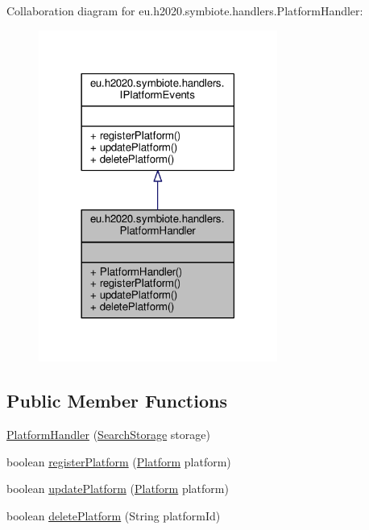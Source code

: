 Collaboration diagram for eu.\+h2020.\+symbiote.\+handlers.\+Platform\+Handler\+:
\nopagebreak
\begin{figure}[H]
\begin{center}
\leavevmode
\includegraphics[width=222pt]{classeu_1_1h2020_1_1symbiote_1_1handlers_1_1PlatformHandler__coll__graph}
\end{center}
\end{figure}
\subsection*{Public Member Functions}
\begin{DoxyCompactItemize}
\item 
\hyperlink{classeu_1_1h2020_1_1symbiote_1_1handlers_1_1PlatformHandler_ad9131f7d4698a8a04f2a96627564c224}{Platform\+Handler} (\hyperlink{classeu_1_1h2020_1_1symbiote_1_1search_1_1SearchStorage}{Search\+Storage} storage)
\item 
boolean \hyperlink{classeu_1_1h2020_1_1symbiote_1_1handlers_1_1PlatformHandler_a88a6b019f2d95821ee3f17c8f6c572a9}{register\+Platform} (\hyperlink{classeu_1_1h2020_1_1symbiote_1_1model_1_1Platform}{Platform} platform)
\item 
boolean \hyperlink{classeu_1_1h2020_1_1symbiote_1_1handlers_1_1PlatformHandler_ac4701e47973cb2061607dc9ee2916393}{update\+Platform} (\hyperlink{classeu_1_1h2020_1_1symbiote_1_1model_1_1Platform}{Platform} platform)
\item 
boolean \hyperlink{classeu_1_1h2020_1_1symbiote_1_1handlers_1_1PlatformHandler_a3c20ba0a131ad392eb74dd481548a062}{delete\+Platform} (String platform\+Id)
\end{DoxyCompactItemize}


